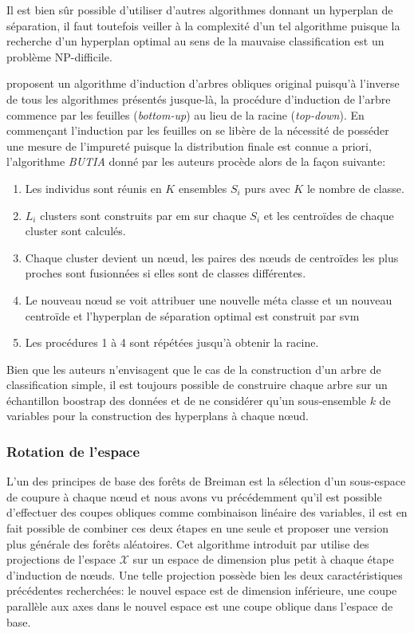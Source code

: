 Il est bien sûr possible d'utiliser d'autres algorithmes donnant un hyperplan de séparation, il faut toutefois veiller à la complexité d'un tel algorithme puisque la recherche d'un hyperplan optimal au sens de la mauvaise classification est un problème NP-difficile.

\citet{Barros2011} proposent un algorithme d'induction d'arbres obliques original puisqu'à l'inverse de tous les algorithmes présentés jusque-là, la procédure d'induction de l'arbre commence par les feuilles (\emph{bottom-up}) au lieu de la racine (\emph{top-down}). En commençant l'induction par les feuilles on se libère de la nécessité de posséder une mesure de l'impureté puisque la distribution finale est connue a priori, l'algorithme \emph{BUTIA} donné par les auteurs procède alors de la façon suivante:
\begin{enumerate}
    \item Les individus sont réunis en $K$ ensembles $S_i$ purs avec $K$ le nombre de classe.
    \item $L_i$ clusters sont construits par \ac{em} sur chaque $S_i$ et les centroïdes de chaque cluster sont calculés.
    \item Chaque cluster devient un nœud, les paires des nœuds de centroïdes les plus proches sont fusionnées si elles sont de classes différentes.
    \item Le nouveau nœud se voit attribuer une nouvelle méta classe et un nouveau centroïde et l'hyperplan de séparation optimal est construit par \ac{svm}
    \item Les procédures 1 à 4 sont répétées jusqu'à obtenir la racine.
\end{enumerate}

Bien que les auteurs n'envisagent que le cas de la construction d'un arbre de classification simple, il est toujours possible de construire chaque arbre sur un échantillon boostrap des données et de ne considérer qu'un sous-ensemble $k$ de variables pour la construction des hyperplans à chaque nœud.

\subsubsection{Rotation de l'espace}

L'un des principes de base des forêts de Breiman est la sélection d'un sous-espace de coupure à chaque nœud et nous avons vu précédemment qu'il est possible d'effectuer des coupes obliques comme combinaison linéaire des variables, il est en fait possible de combiner ces deux étapes en une seule et proposer une version plus générale des forêts aléatoires. Cet algorithme introduit par \citet{Tomita2015} utilise des projections de l'espace $\mathcal{X}$ sur un espace de dimension plus petit à chaque étape d'induction de nœuds. Une telle projection possède bien les deux caractéristiques précédentes recherchées: le nouvel espace est de dimension inférieure, une coupe parallèle aux axes dans le nouvel espace est une coupe oblique dans l'espace de base.


